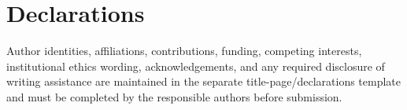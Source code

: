 \documentclass[11pt]{article}
\begin{document}
\section*{Declarations}
Author identities, affiliations, contributions, funding, competing interests, institutional ethics wording, acknowledgements, and any required disclosure of writing assistance are maintained in the separate title-page/declarations template and must be completed by the responsible authors before submission.



\end{document}
